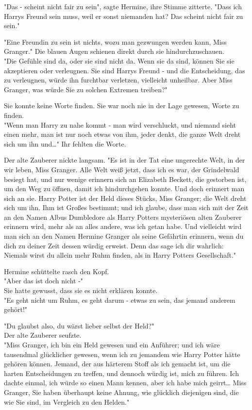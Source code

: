 {"Das - scheint nicht fair zu sein", sagte Hermine, ihre Stimme zitterte. "Dass ich Harrys Freund sein muss, weil er sonst niemanden hat? Das scheint nicht fair zu sein."

"Eine Freundin zu sein ist nichts, wozu man gezwungen werden kann, Miss Granger." Die blauen Augen schienen direkt durch sie hindurchzuschauen.\\ "Die Gefühle sind da, oder sie sind nicht da. Wenn sie da sind, können Sie sie akzeptieren oder verleugnen. Sie sind Harrys Freund - und die Entscheidung, das zu verleugnen, würde ihn furchtbar verletzen, vielleicht unheilbar. Aber Miss Granger, was würde Sie zu solchen Extremen treiben?"

Sie konnte keine Worte finden. Sie war noch nie in der Lage gewesen, Worte zu finden.\\ "Wenn man Harry zu nahe kommt - man wird verschluckt, und niemand sieht einen mehr, man ist nur noch etwas von ihm, jeder denkt, die ganze Welt dreht sich um ihn und…" Ihr fehlten die Worte.

Der alte Zauberer nickte langsam. "Es ist in der Tat eine ungerechte Welt, in der wir leben, Miss Granger. Alle Welt weiß jetzt, dass ich es war, der Grindelwald besiegt hat, und nur wenige erinnern sich an Elizabeth Beckett, die gestorben ist, um den Weg zu öffnen, damit ich hindurchgehen konnte. Und doch erinnert man sich an sie. Harry Potter ist der Held dieses Stücks, Miss Granger; die Welt dreht sich um ihn. Ihm ist Großes bestimmt; und ich glaube, dass man sich mit der Zeit an den Namen Albus Dumbledore als Harry Potters mysteriösen alten Zauberer erinnern wird, mehr als an alles andere, was ich getan habe. Und vielleicht wird man sich an den Namen Hermine Granger als seine Gefährtin erinnern, wenn du dich zu deiner Zeit dessen würdig erweist. Denn das sage ich dir wahrlich: Niemals wirst du allein mehr Ruhm finden, als in Harry Potters Gesellschaft."

Hermine schüttelte rasch den Kopf.\\ "Aber das ist doch nicht -"\\ Sie hatte gewusst, dass sie es nicht erklären konnte.\\ "Es geht nicht um Ruhm, es geht darum - etwas zu sein, das jemand anderem gehört!"

"Du glaubst also, du wärst lieber selbst der Held?"\\ Der alte Zauberer seufzte.\\ "Miss Granger, ich bin ein Held gewesen und ein Anführer; und ich wäre tausendmal glücklicher gewesen, wenn ich zu jemandem wie Harry Potter hätte gehören können. Jemand, der aus härterem Stoff als ich gemacht ist, um die harten Entscheidungen zu treffen, und dennoch würdig ist, mich zu führen. Ich dachte einmal, ich würde so einen Mann kennen, aber ich habe mich geirrt… Miss Granger, Sie haben überhaupt keine Ahnung, wie glücklich diejenigen sind, die wie Sie sind, im Vergleich zu den Helden."

}
